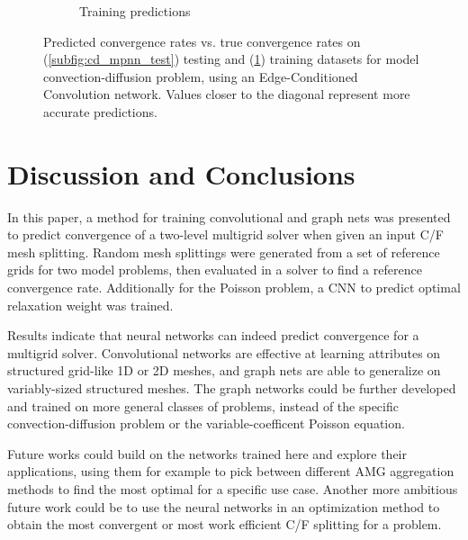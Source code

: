 \documentclass[review]{siamart190516}
\begin{document}
\begin{figure}[h]
\begin{subfigure}{.48\textwidth}
    \caption{Training predictions}
    \label{subfig:cd_mpnn_train}
  \end{subfigure}
  \caption{Predicted convergence rates vs. true convergence rates on (\ref{subfig:cd_mpnn_test}) testing and (\ref{subfig:cd_mpnn_train}) training datasets for model convection-diffusion problem, using an Edge-Conditioned Convolution network. Values closer to the diagonal represent more accurate predictions.}
  \label{fig:cd_mpnn_pred}
\end{figure}

\section{Discussion and Conclusions}\label{sec:conc}

In this paper, a method for training convolutional and graph nets was presented to predict convergence of a two-level multigrid solver when given an input C/F mesh splitting.  Random mesh splittings were generated from a set of reference grids for two model problems, then evaluated in a solver to find a reference convergence rate.  Additionally for the Poisson problem, a CNN to predict optimal relaxation weight was trained.

Results indicate that neural networks can indeed predict convergence for a multigrid solver.  Convolutional networks are effective at learning attributes on structured grid-like 1D or 2D meshes, and graph nets are able to generalize on variably-sized structured meshes.  The graph networks could be further developed and trained on more general classes of problems, instead of the specific convection-diffusion problem or the variable-coefficent Poisson equation.

Future works could build on the networks trained here and explore their applications, using them for example to pick between different AMG aggregation methods to find the most optimal for a specific use case.  Another more ambitious future work could be to use the neural networks in an optimization method to obtain the most convergent or most work efficient C/F splitting for a problem.



\end{document}
